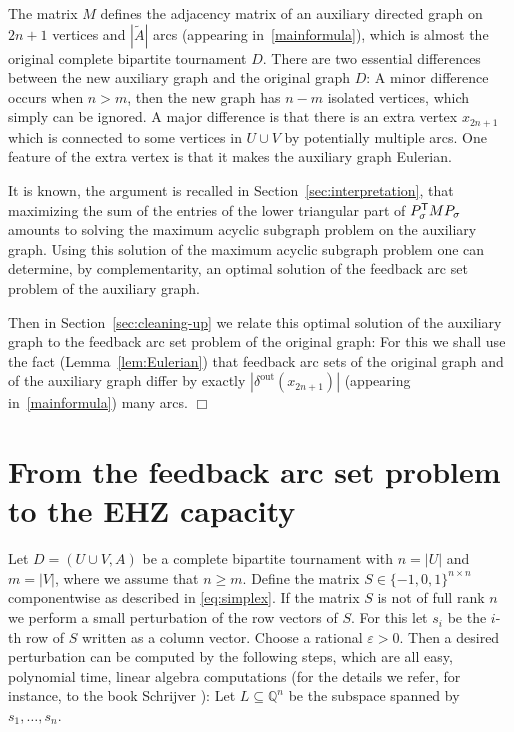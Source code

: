 \documentclass{amsart}
\newcommand{\Q}{\mathbb{Q}}
\newcommand{\deltaout}{\delta^{\mathrm{out}}}
\begin{document}
The matrix $M$ defines the adjacency matrix of an auxiliary directed
graph on $2n+1$ vertices and $|\tilde{A}|$ arcs (appearing in~\eqref{mainformula}),
which is almost the original complete
bipartite tournament $D$. There are two essential differences between
the new auxiliary graph and the original graph $D$: A minor difference
occurs when $n > m$, then the new graph has $n-m$ isolated vertices,
which simply can be ignored. A major difference is that there is an
extra vertex $x_{2n+1}$ which is connected to some vertices in
$U \cup V$ by potentially multiple arcs. One feature of the
extra vertex is that it makes the auxiliary graph Eulerian.

It is known, the argument is recalled in
Section~\ref{sec:interpretation}, that maximizing the sum of the
entries of the lower triangular part of
$P_{\sigma}^{\sf T} M P_{\sigma}$ amounts to solving the maximum
acyclic subgraph problem on the auxiliary graph. Using this solution of
the maximum acyclic subgraph problem one can determine, by
complementarity, an optimal solution of the feedback arc set
problem of the auxiliary graph.

\smallskip

Then in Section~\ref{sec:cleaning-up} we relate this optimal solution
of the auxiliary graph to the feedback arc set problem of
the original graph: For this we shall use the fact
(Lemma~\ref{lem:Eulerian}) that feedback arc sets of the
original graph and of the auxiliary graph differ by exactly
$|\deltaout(x_{2n+1})|$ (appearing in~\eqref{mainformula}) many arcs. \hfill $\Box$

%
%
%

\section{From the feedback arc set problem to the EHZ capacity}
\label{sec:from-feedback-arc-set-to-cEHZ}

Let $D = (U \cup V, A)$ be a complete bipartite tournament with
$n = |U|$ and $m = |V|$, where we assume that $n \geq m$. Define the
matrix $S \in \{-1,0,1\}^{n \times n}$ componentwise as described in
\eqref{eq:simplex}.  If the matrix $S$ is not of full rank $n$ we
perform a small perturbation of the row vectors of $S$. For this let
$s_i$ be the $i$-th row of $S$ written as a column vector. Choose a
rational $\varepsilon > 0$. Then a desired perturbation can be
computed by the following steps, which are all easy, polynomial time,
linear algebra computations (for the details we refer, for instance,
to the book Schrijver \cite{Schrijver-1986}): Let $L \subseteq \Q^n$
be the subspace spanned by $s_1, \ldots, s_n$.
\end{document}
